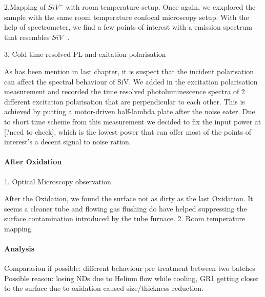 2.Mapping of $SiV^{-}$ with room temperature setup.
Once again, we exxplored the sample with the same room temperature confocal microscopy setup. With the help of spectrometer, we find a few points of interest with a emission spectrum that resembles $SiV^{-}$. 

3. Cold time-resolved PL and exitation polarisation

As has been mention in last chapter, it is suspect that the incident polarisation can affect the spectral behaviour of SiV. We added in the excitation polarisation measurement and recorded the time resolved photoluminescence spectra of 2 different excitation polarisation that are perpendicular to each other. This is achieved by putting a motor-driven half-lambda plate after the noise eater. 
Due to short time scheme from this measurement we decided to fix the input power at [?need to check], which is the lowest power that can offer most of the points of interest's a decent signal to noise ration.



\paragraph{After Oxidation} 

1. Optical Microscopy observation. 

After the Oxidation, we found the surface not as dirty as the last Oxidation. It seems a cleaner tube and flowing gas flushing do have helped suppressing the surface contamination introduced by the tube furnace.
2. Room temperature mapping



\paragraph{Analysis} 
Comparasion if possible: different behaviour pre treatment between two batches
Possible reason: losing NDs due to Helium flow while cooling, GR1 getting closer to the surface due to oxidation caused size/thickness reduction.

